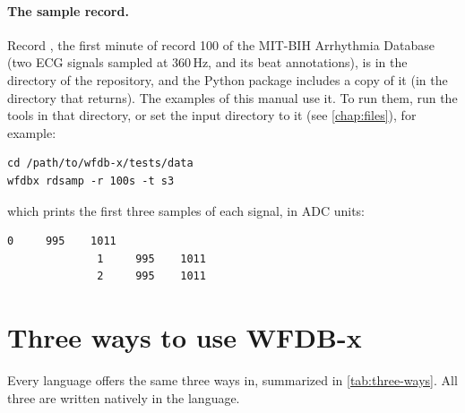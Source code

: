 \paragraph{The sample record.} Record , the first minute of record
100 of the MIT-BIH Arrhythmia Database (two ECG signals sampled at 360\,Hz,
and its beat annotations), is in the directory  of the
repository, and the Python package includes a copy of it (in the directory
that  returns). The examples of this manual
use it. To run them, run the tools in that directory, or set the input
directory to it (see \cref{chap:files}), for example:
\begin{lstlisting}[style=shell]
cd /path/to/wfdb-x/tests/data
wfdbx rdsamp -r 100s -t s3
\end{lstlisting}
which prints the first three samples of each signal, in ADC units:
\begin{lstlisting}[style=text]
              0	    995	   1011
              1	    995	   1011
              2	    995	   1011
\end{lstlisting}

\section{Three ways to use WFDB-x}
\label{sec:three-ways}

Every language offers the same three ways in, summarized in
\cref{tab:three-ways}. All three are written natively in the language.

